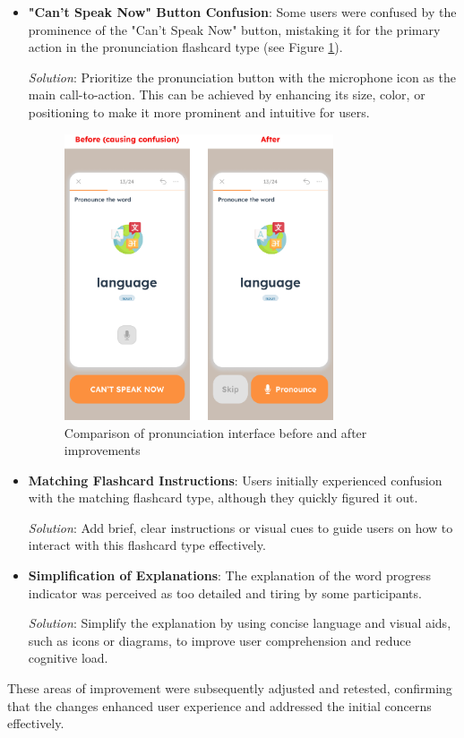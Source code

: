 \begin{itemize}
    \item \textbf{"Can't Speak Now" Button Confusion}: Some users were confused by the prominence of the "Can't Speak Now" button, mistaking it for the primary action in the pronunciation flashcard type (see Figure \ref{fig:em-testing-pronunciation-before-after}).
    
    \textit{Solution}: Prioritize the pronunciation button with the microphone icon as the main call-to-action. This can be achieved by enhancing its size, color, or positioning to make it more prominent and intuitive for users.

    \begin{figure}[!h]
        \centering
        \includegraphics[width=0.75\textwidth]{src/figures/em-testing-pronunciation-before-after.png}
        \caption{Comparison of pronunciation interface before and after improvements}
        \label{fig:em-testing-pronunciation-before-after}
    \end{figure}
    
    \item \textbf{Matching Flashcard Instructions}: Users initially experienced confusion with the matching flashcard type, although they quickly figured it out.
    
    \textit{Solution}: Add brief, clear instructions or visual cues to guide users on how to interact with this flashcard type effectively.
    
    \item \textbf{Simplification of Explanations}: The explanation of the word progress indicator was perceived as too detailed and tiring by some participants.
    
    \textit{Solution}: Simplify the explanation by using concise language and visual aids, such as icons or diagrams, to improve user comprehension and reduce cognitive load.
\end{itemize}

These areas of improvement were subsequently adjusted and retested, confirming that the changes enhanced user experience and addressed the initial concerns effectively.

